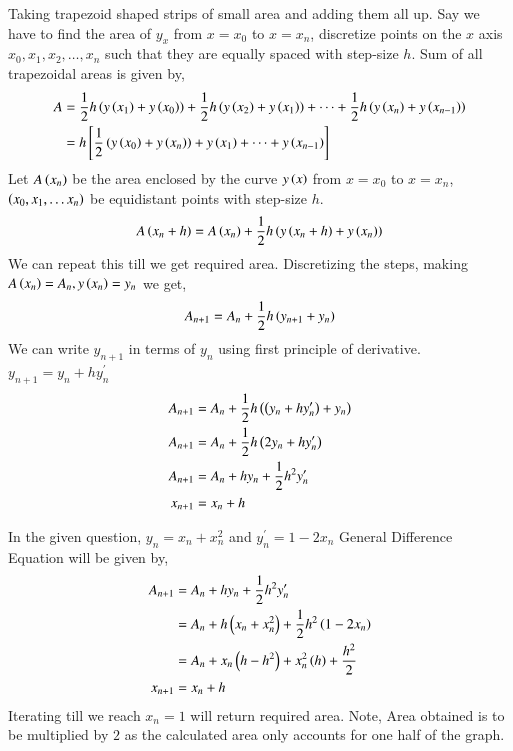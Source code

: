 \documentclass[journal]{IEEEtran}
\begin{document}
Taking trapezoid shaped strips of small area and adding them all up. Say we have to find the area of $y_{x}$ from $x=x_0$ to $x=x_n$, discretize points on the $x$ axis $x_0, x_1, x_2, \dots, x_n$ such that they are equally spaced with step-size $h$. \newline
Sum of all trapezoidal areas is given by,
\begin{align}
  A&=\frac{1}{2}h\left(y\left(x_1\right)+y\left(x_0\right)\right)+ \frac{1}{2}h\left(y\left(x_2\right)+y\left(x_1\right)\right)+\dots+\frac{1}{2}h\left(y\left(x_n\right)+y\left(x_{n-1}\right)\right)\\
  &=h{}\left[\frac{1}{2}\left(y\left(x_0\right)+y\left(x_n\right)\right)+ y\left(x_1\right)+\dots+y\left(x_{n-1}\right)\right]
\end{align}
Let $A\left(x_n\right)$ be the area enclosed by the curve $y\left(x\right)$ from $x=x_0$ to $x=x_n$, $\left(x_0, x_1, \dots x_n\right)$ be equidistant points with step-size $h$.
\begin{align}
  A\left(x_n+h\right)=A\left(x_n\right)+\frac{1}{2}h\left(y\left(x_n+h\right)+y\left(x_n\right)\right)
\end{align}
We can repeat this till we get required area.\newline
Discretizing the steps, making $A\left(x_n\right)=A_n, y\left(x_n\right)=y_n$ we get,
\begin{align}
 A_{n+1}=A_n+\frac{1}{2}h\left(y_{n+1}+y_n\right)
\end{align}
We can write $y_{n+1}$ in terms of $y_n$ using first principle of derivative. $y_{n+1}=y_n+hy^{\prime}_n$
\begin{align}
  A_{n+1}&=A_n+\frac{1}{2}h\left(\left(y_{n}+hy^{\prime}_n\right)+y_n\right)\\
  A_{n+1}&=A_n+\frac{1}{2}h\left(2y_n+hy^{\prime}_n\right)\\
  A_{n+1}&=A_n+hy_n+\frac{1}{2}h^2y^{\prime}_n\\
  x_{n+1}&=x_n+h
\end{align}

In the given question, $y_n=x_n+x_n^2$ and $y^{\prime}_n=1-2x_n$\newline
General Difference Equation will be given by,
\begin{align}
  A_{n+1}&=A_n+hy_n+\frac{1}{2}h^2y^{\prime}_n\\
  &=A_n+h\left(x_n+x_n^2\right)+\frac{1}{2}h^2\left(1-2x_n\right)\\
  &=A_n+x_n\left(h-h^2\right)+x_n^2\left(h\right)+\frac{h^2}{2}\\
  x_{n+1}&=x_n+h
\end{align}
Iterating till we reach $x_n=1$ will return required area. Note, Area obtained is to be multiplied by $2$ as the calculated area only accounts for one half of the graph.\newline
\end{document}
